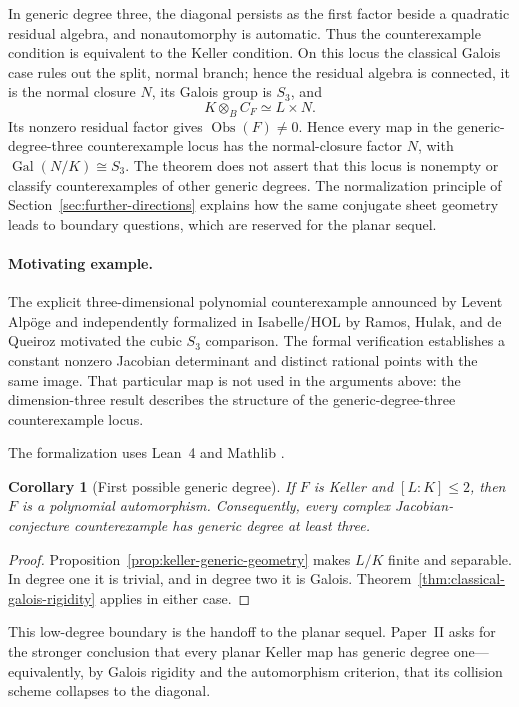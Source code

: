 \documentclass[11pt]{article}
\newtheorem{corollary}[theorem]{Corollary}
\theoremstyle{remark}
\theoremstyle{definition}
\DeclareMathOperator{\Gal}{Gal}
\newcommand{\Obs}{\operatorname{Obs}}
\begin{document}
In generic degree three, the diagonal persists as the first factor beside
a quadratic residual algebra, and nonautomorphy is automatic.  Thus the
counterexample condition is equivalent to the Keller condition.  On this
locus the classical Galois case rules out the split, normal branch; hence
the residual algebra is connected, it is the normal closure \(N\), its
Galois group is \(S_3\), and
\[
  K\otimes_BC_F\simeq L\times N.
\]
Its nonzero residual factor gives \(\Obs(F)\neq0\).  Hence every map in
the generic-degree-three counterexample locus has the normal-closure factor
\(N\), with \(\Gal(N/K)\cong S_3\).  The theorem does not assert that this
locus is nonempty or classify counterexamples of other generic degrees.
The normalization principle
of Section~\ref{sec:further-directions} explains how the same conjugate
sheet geometry leads to boundary questions, which are reserved for the
planar sequel.

\paragraph{Motivating example.}
The explicit three-dimensional polynomial counterexample announced by
Levent Alpöge \cite{Alpoge2026} and independently formalized in
Isabelle/HOL by Ramos, Hulak, and de Queiroz
\cite{AFPJacobianCounterexample} motivated the cubic \(S_3\) comparison.
The formal verification establishes a
constant nonzero Jacobian determinant and distinct rational points with
the same image.  That particular map is not used in the arguments above:
the dimension-three result describes the structure of the
generic-degree-three counterexample locus.

The formalization uses Lean~4 and Mathlib \cite{Lean4,Mathlib}.

\begin{corollary}[First possible generic degree]
\label{cor:first-possible-generic-degree}
If \(F\) is Keller and \([L:K]\leq2\), then \(F\) is a polynomial
automorphism.  Consequently, every complex Jacobian-conjecture counterexample
has generic degree at least three.
\end{corollary}

\begin{proof}
Proposition~\ref{prop:keller-generic-geometry} makes \(L/K\) finite and
separable.  In degree one it is trivial, and in degree two it is Galois.
Theorem~\ref{thm:classical-galois-rigidity} applies in either case.
\end{proof}

This low-degree boundary is the handoff to the planar sequel.  Paper~II asks
for the stronger conclusion that every planar Keller map has generic degree
one---equivalently, by Galois rigidity and the automorphism criterion, that
its collision scheme collapses to the diagonal.
\end{document}
